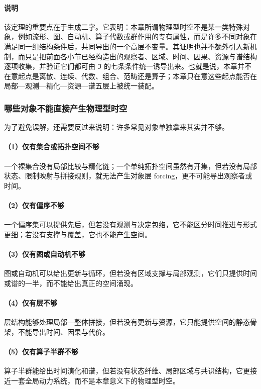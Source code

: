 \paragraph{说明}
该定理的重要点在于生成二字。它表明：本章所谓物理型时空不是某一类特殊对象，例如流形、图、自动机、算子代数或群作用的专有属性，而是许多不同对象在满足同一组结构条件后，共同导出的一个高层不变量。其证明也并不额外引入新机制，而只是把前面各小节已经构造出的观察者、区域、时间、因果、资源与谱结构逐项收集，并验证它们都可由 \(\mathfrak I\) 的七条条件统一诱导出来。也就是说，本章并不在意起点是离散、连续、代数、组合、范畴还是算子；本章只在意这些起点能否在局部—观测—精化—资源—谱五层上被统一装配。

\subsubsection{哪些对象不能直接产生物理型时空}

为了避免误解，还需要反过来说明：许多常见对象单独拿来其实并不够。

\paragraph{（1）仅有集合或拓扑空间不够}
一个裸集合没有局部比较与精化链；一个单纯拓扑空间虽然有开集，但若没有局部状态、限制映射与拼接规则，就无法产生对象层 forcing，更不可能导出观察者或时间。

\paragraph{（2）仅有偏序不够}
一个偏序集可以提供先后，但若没有观测与决定包络，它不能区分时间推进与形式更细；若没有支撑与覆盖，它也不能产生空间。

\paragraph{（3）仅有图或自动机不够}
图或自动机可以给出更新与循环，但若没有区域支撑与局部观测，它们只提供时间或谱的一半，而不能给出真正的空间涌现。

\paragraph{（4）仅有层不够}
层结构能够处理局部—整体拼接，但若没有更新与资源，它只能提供空间的静态骨架，不能导出时间、因果与代价。

\paragraph{（5）仅有算子半群不够}
算子半群能给出时间演化和谱，但若没有状态纤维、局部区域与共识结构，它更接近一套全局动力系统，而不是本章意义下的物理型时空。

